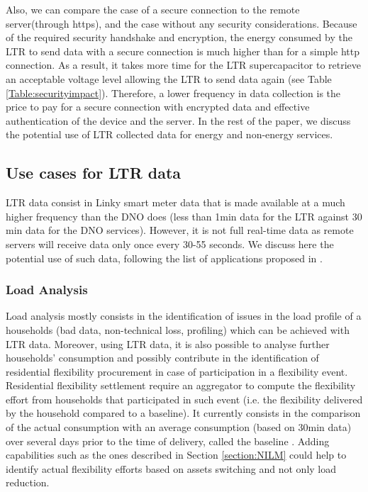 \documentclass[conference]{IEEEtran}
\begin{document}
Also, we can compare the case of a secure connection to the remote server(through https), and the case without any security considerations. Because of the required security handshake and encryption, the energy consumed by the LTR to send data with a secure connection is much higher than for a simple http connection. As a result, it takes more time for the LTR supercapacitor to retrieve an acceptable voltage level allowing the LTR to send data again (see Table \ref{Table:securityimpact}). Therefore, a lower frequency in data collection is the price to pay for a secure connection with encrypted data and effective authentication of the device and the server. In the rest of the paper, we discuss the potential use of LTR collected data for energy and non-energy services. 


\subsection{Use cases for LTR data}
LTR data consist in Linky smart meter data that is made available at a much higher frequency than the DNO does (less than 1min data for the LTR against 30 min data for the DNO services). However, it is not full real-time data as remote servers will receive data only once every 30-55 seconds. We discuss here the potential use of such data, following the list of applications proposed in \cite{IEEE:ReviewSmartMeterData}.
\subsubsection{Load Analysis }
Load analysis mostly consists in the identification of issues in the load profile
 of a households (bad data, non-technical loss, profiling) which can be achieved with LTR data. Moreover, using LTR data, it is also possible to analyse further households' consumption and possibly contribute in the identification of residential flexibility procurement in case of participation in a flexibility event. Residential flexibility settlement require an aggregator to compute the flexibility effort from households that participated in such event (i.e. the flexibility delivered by the household compared to a baseline). It currently consists in the comparison of  the actual consumption with an average consumption  (based on 30min data) over several days prior to the time of delivery, called the baseline \cite{ESO:BaselineP376}. Adding capabilities such as the ones described in Section \ref{section:NILM} could help to identify actual flexibility efforts based on assets switching and not only load reduction.
\end{document}
